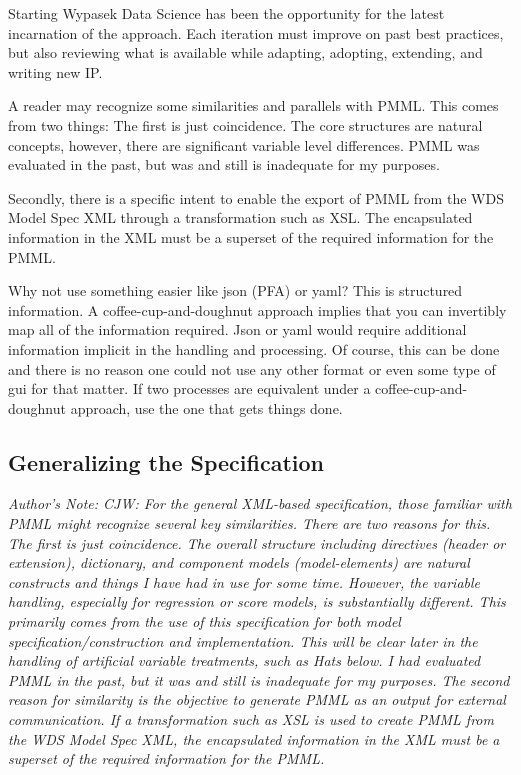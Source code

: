 \documentclass[10pt]{article}
\begin{document}
Starting Wypasek Data Science has been the opportunity for the latest incarnation of the approach. Each iteration must improve on past best practices, but also reviewing what is available while adapting, adopting, extending, and writing new IP.

A reader may recognize some similarities and parallels with PMML.  This comes from two things:  The first is just coincidence. The core structures are natural concepts, however, there are significant variable level differences.   PMML was evaluated in the past, but was and still is inadequate for my purposes. 

Secondly, there is a specific intent to enable the export of PMML from the WDS Model Spec XML through a transformation such as XSL.  The encapsulated information in the XML must be a superset of the required information for the PMML.

Why not use something easier like json (PFA) or yaml?  This is structured information.  A coffee-cup-and-doughnut approach implies that you can invertibly map all of the information required.  Json or yaml would require additional information implicit in the handling and processing.  Of course, this can be done and there is no reason one could not use any other format or even some type of gui for that matter.  If two processes are equivalent under a coffee-cup-and-doughnut approach, use the one that gets things done.

\fi


\subsection{Generalizing the Specification\label{generalizing_the_specification}}

{\em Author's Note: CJW: For the general XML-based specification, those familiar with PMML might recognize several key similarities.  There are
two reasons for this.  The first is just coincidence.  The overall structure including directives (header or extension), dictionary, and
component models (model-elements) are natural constructs and things I have had in use for some time. However, the variable handling, especially
for regression or score models, is substantially different.  This primarily comes from the use of this specification for both model
specification/construction and
implementation.  This will be clear later in the handling of artificial variable treatments, such as {\em Hats} below.  
I had evaluated PMML in the past, but it was and still is inadequate for my purposes.  The second reason for similarity is the objective to generate PMML as an
output for external communication.  If a transformation such as XSL is used to create PMML from the WDS Model Spec XML, the encapsulated
information in the XML must be a superset of the required information for the PMML.
}
\end{document}
